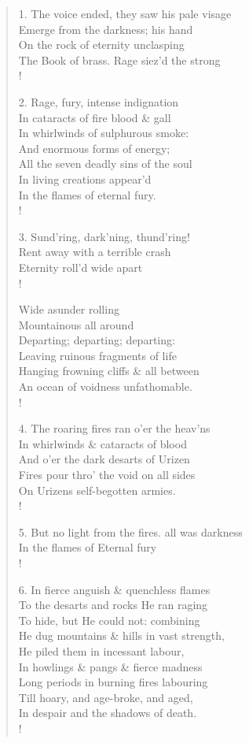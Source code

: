 \documentclass[9pt]{extarticle}
\begin{document}
\begin{verse}
\begin{altverse} 
		
		1. The voice ended, they saw his pale visage\\
		Emerge from the darkness; his hand\\
		On the rock of eternity unclasping\\
		The Book of brass. Rage siez'd the strong\\!
		
		2. Rage, fury, intense indignation\\
		In cataracts of fire blood \& gall\\
		In whirlwinds of sulphurous smoke:\\
		And enormous forms of energy;\\
		All the seven deadly sins of the soul\\
		In living creations appear'd\\
		In the flames of eternal fury.\\!
		
		3. Sund'ring, dark'ning, thund'ring!\\
		Rent away with a terrible crash\\
		Eternity roll'd wide apart\\!
		
		Wide asunder rolling\\
		Mountainous all around\\
		Departing; departing; departing:\\
		Leaving ruinous fragments of life\\
		Hanging frowning cliffs \& all between\\
		An ocean of voidness unfathomable.\\!
		
		4. The roaring fires ran o'er the heav'ns\\
		In whirlwinds \& cataracts of blood\\
		And o'er the dark desarts of Urizen\\
		Fires pour thro' the void on all sides\\
		On Urizens self-begotten armies.\\!
		
		5. But no light from the fires. all was darkness\\
		In the flames of Eternal fury\\!
		
		6. In fierce anguish \& quenchless flames\\
		To the desarts and rocks He ran raging\\
		To hide, but He could not: combining\\
		He dug mountains \& hills in vast strength,\\
		He piled them in incessant labour,\\
		In howlings \& pangs \& fierce madness\\
		Long periods in burning fires labouring\\
		Till hoary, and age-broke, and aged,\\
		In despair and the shadows of death.\\!
		

\end{altverse}
\end{verse}
\end{document}
